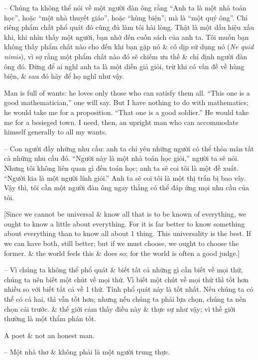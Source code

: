 \documentclass{article}
\begin{document}
\begin{enumerate}
\begin{itemize}
		-- Chúng ta không thể nói về một người đàn ông rằng ``Anh ta là một nhà toán học'', hoặc ``một nhà thuyết giáo'', hoặc ``hùng biện''; mà là ``một quý ông''. Chỉ riêng phẩm chất phổ quát đó cũng đủ làm tôi hài lòng. Thật là một dấu hiệu xấu khi, khi nhìn thấy một người, bạn nhớ đến cuốn sách của anh ta. Tôi muốn bạn không thấy phẩm chất nào cho đến khi bạn gặp nó \& có dịp sử dụng nó ({\it Ne quid nimis}), vì sợ rằng một phẩm chất nào đó sẽ chiếm ưu thế \& chỉ định người đàn ông đó. Đừng để ai nghĩ anh ta là một diễn giả giỏi, trừ khi có vấn đề về hùng biện, \& sau đó hãy để họ nghĩ như vậy.
		
		 Man is full of wants: he loves only those who can satisfy them all. ``This one is a good mathematician,'' one will say. But I have nothing to do with mathematics; he would take me for a proposition. ``That one is a good soldier.'' He would take me for a besieged town. I need, then, an upright man who can accommodate himself generally to all my wants.
		
		-- Con người đầy những nhu cầu: anh ta chỉ yêu những người có thể thỏa mãn tất cả những nhu cầu đó. ``Người này là một nhà toán học giỏi,'' người ta sẽ nói. Nhưng tôi không liên quan gì đến toán học; anh ta sẽ coi tôi là một đề xuất. ``Người kia là một người lính giỏi.'' Anh ta sẽ coi tôi là một thị trấn bị bao vây. Vậy thì, tôi cần một người đàn ông ngay thẳng có thể đáp ứng mọi nhu cầu của tôi.
		
		 [Since we cannot be universal \& know all that is to be known of everything, we ought to know a little about everything. For it is far better to know something about everything than to know all about 1 thing. This universality is the best. If we can have both, still better; but if we must choose, we ought to choose the former. \& the world feels this \& does so; for the world is often a good judge.]
		
		-- Vì chúng ta không thể phổ quát \& biết tất cả những gì cần biết về mọi thứ, chúng ta nên biết một chút về mọi thứ. Vì biết một chút về mọi thứ thì tốt hơn nhiều so với biết tất cả về 1 thứ. Tính phổ quát này là tốt nhất. Nếu chúng ta có thể có cả hai, thì vẫn tốt hơn; nhưng nếu chúng ta phải lựa chọn, chúng ta nên chọn cái trước. \& thế giới cảm thấy điều này \& thực sự như vậy; vì thế giới thường là một thẩm phán tốt.
		
		 A poet \& not an honest man.
		
		-- Một nhà thơ \& không phải là một người trung thực.
		

\end{itemize}
\end{enumerate}
\end{document}
